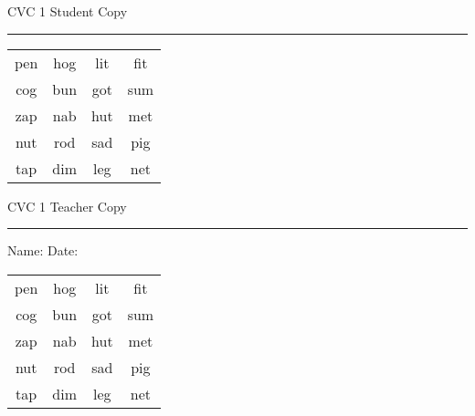 \documentclass{memoir}
\begin{document}

\footnotesize \noindent
CVC 1 \hfill Student Copy
\smallskip
\hrule

\Large

\setlength{\tabcolsep}{14pt}
\def\arraystretch{2}

{\selectfont


\begin{vplace}[0.5]
\begin{center}
\begin{tabular}{cccc}
pen & hog & lit & fit \\
cog & bun & got & sum \\
zap & nab & hut & met \\
nut & rod & sad & pig \\
tap & dim & leg & net \\
\end{tabular}
\end{center}
\end{vplace}

}

\newpage

\footnotesize \noindent
CVC 1 \hfill Teacher Copy
\smallskip
\hrule

\small

\vfill

\noindent
Name: \underline{\hspace{1.75in}} \hfill Date: \underline{\hspace{1in}}

\Large

{\selectfont


\begin{vplace}[0.5]
\begin{center}
\begin{tabular}{cccc}
pen & hog & lit & fit \\
cog & bun & got & sum \\
zap & nab & hut & met \\
nut & rod & sad & pig \\
tap & dim & leg & net \\
\end{tabular}
\end{center}
\end{vplace}



}
\end{document}
